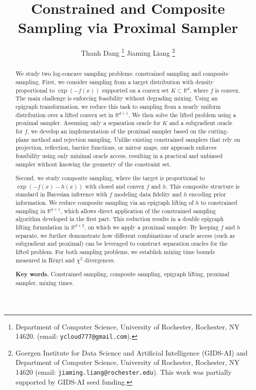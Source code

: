 \documentclass[11pt,letterpaper]{article}
\newcommand{\R}{\mathbb{R}}
\begin{document}
	\title{Constrained and Composite Sampling via Proximal Sampler}
	\date{}
	\author{
    	Thanh Dang  \thanks{Department of Computer Science, University of Rochester, Rochester, NY 14620. 
        (email: {\tt ycloud777@gmail.com}).}
        \qquad
	 	Jiaming Liang \thanks{
        Goergen Institute for Data Science and Artificial Intelligence (GIDS-AI) and Department of Computer Science, University of Rochester, Rochester, NY 14620 (email: {\tt jiaming.liang@rochester.edu}). This work was partially supported by GIDS-AI seed funding.}
	}
\maketitle
	
	\begin{abstract}	
We study two log-concave sampling problems: constrained sampling and composite sampling.
First, we consider sampling from a target distribution with density proportional to $\exp(-f(x))$ supported on a convex set $K \subset \R^d$, where $f$ is convex. The main challenge is enforcing feasibility without degrading mixing. Using an epigraph transformation, we reduce this task to sampling from a nearly uniform distribution over a lifted convex set in $\R^{d+1}$. We then solve the lifted problem using a proximal sampler.
Assuming only a separation oracle for $K$ and a subgradient oracle for $f$, we develop an implementation of the proximal sampler based on the cutting-plane method and rejection sampling. Unlike existing constrained samplers that rely on projection, reflection, barrier functions, or mirror maps, our approach enforces feasibility using only minimal oracle access, resulting in a practical and unbiased sampler without knowing the geometry of the constraint set.

Second, we study composite sampling, where the target is proportional to $\exp(-f(x)-h(x))$ with closed and convex $f$ and $h$. This composite structure is standard in Bayesian inference with $f$ modeling data fidelity and $h$ encoding prior information.
We reduce composite sampling via an epigraph lifting of $h$ to constrained sampling in $\R^{d+1}$, which allows direct application of the constrained sampling algorithm developed in the first part. This reduction results in a double epigraph lifting formulation in $\R^{d+2}$, on which we apply a proximal sampler. By keeping $f$ and $h$ separate, we further demonstrate how different combinations of oracle access (such as subgradient and proximal) can be leveraged to construct separation oracles for the lifted problem.
For both sampling problems, we establish mixing time bounds measured in Rényi and $\chi^2$ divergences.
	
	
	{\bf Key words.}   Constrained sampling, composite sampling, epigraph lifting, proximal sampler, mixing times. 
		\end{abstract}
\end{document}
